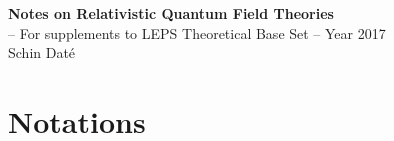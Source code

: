 \documentclass{article}
\newcounter{problem}
\begin{document}
\begin{titlepage} 
\vspace*{3cm}
\vspace*{2cm}
\noindent
\begin{center}
{\Huge \bf Notes on Relativistic Quantum Field Theories}   \\
-- For supplements to LEPS Theoretical Base Set --
\vspace{1cm}
{\large Year 2017}
\vspace{1cm}
\\
{\Large 
Schin Dat\'e}
\end{center}
\end{titlepage} 

\setcounter{section}{-1}
\setcounter{page}{0}

\tableofcontents   %

\setcounter{footnote}{0}
\setcounter{equation}{0}
\setcounter{figure}{0}
\setcounter{problem}{0}

\newpage %


\vspace*{-18mm}
\setcounter{section}{-1}
\setcounter{page}{1}
\section{Notations}

\end{document}
